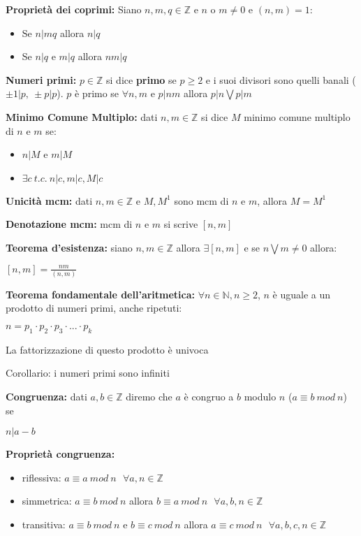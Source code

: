 \documentclass[12pt, a4paper]{article}
\begin{document}
\textbf{Proprietà dei coprimi:} Siano $n,m,q\in\mathbb{Z}$ e $n$ o $m\neq 0$ e $(n,m)=1$:
\begin{itemize}
    \item Se $n|mq$ allora $n|q$
    \item Se $n|q$ e $m|q$ allora $nm|q$
\end{itemize} 

\textbf{Numeri primi:} $p\in\mathbb{Z}$ si dice \textbf{primo} se $p\geq 2$ e i suoi divisori sono quelli banali 
($\pm 1|p,\ \pm p|p$). $p$ è primo se $\forall n,m$ e $p|nm$ allora $p|n\bigvee p|m$

\textbf{Minimo Comune Multiplo:} dati $n,m\in\mathbb{Z}$ si dice $M$ minimo comune multiplo di $n$ e $m$ se:
\begin{itemize}
    \item $n|M$ e $m|M$
    \item $\exists c\ t.c.\ n|c, m|c, M|c$
\end{itemize}

\textbf{Unicità mcm:} dati $n,m\in\mathbb{Z}$ e $M,M^{1}$ sono mcm di $n$ e $m$, allora $M=M^{1}$

\textbf{Denotazione mcm:} mcm di $n$ e  $m$ si scrive $[n,m]$

\textbf{Teorema d'esistenza:} siano $n,m\in\mathbb{Z}$ allora $\exists [n,m]$ e se $n\bigvee m\neq 0$ allora:
\begin{center}
    $[n,m] = \frac{nm}{(n,m)}$
\end{center}

\textbf{Teorema fondamentale dell'aritmetica:} $\forall n\in\mathbb{N},n\geq 2$, $n$ è uguale a un prodotto di numeri
primi, anche ripetuti:
\begin{center}
    $n=p_{1}\cdot p_{2}\cdot p_{3}\cdot ... \cdot p_{k}$
\end{center}
La fattorizzazione di questo prodotto è univoca

Corollario: i numeri primi sono infiniti

\textbf{Congruenza:} dati $a,b\in\mathbb{Z}$ diremo che $a$ è  congruo a $b$ modulo $n$ ($a\equiv b\ mod\ n$) se
\begin{center}
    $n|a-b$
\end{center} 

\textbf{Proprietà congruenza:} 
\begin{itemize}
    \item riflessiva: $a\equiv a\ mod\ n\ \ \ \forall a,n\in\mathbb{Z}$
    \item simmetrica: $a\equiv b\ mod\ n$ allora $b\equiv a\ mod\ n\ \ \ \forall a,b,n\in\mathbb{Z}$
    \item transitiva: $a\equiv b\ mod\ n$ e $b\equiv c\ mod\ n$ allora $a\equiv c\ mod\ n\ \ \ 
    \forall a,b,c,n\in\mathbb{Z}$
\end{itemize}
\end{document}
